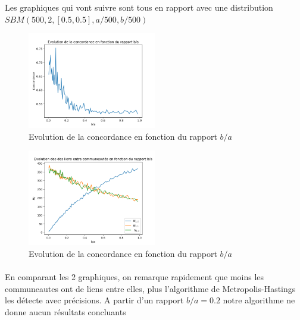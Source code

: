 \subsubsection{}
\paragraph*{}
Les graphiques qui vont suivre sont tous en rapport avec une distribution
 $SBM(500,2,[0.5,0.5],a/500,b/500)$
\begin{figure}[H]
    \centering
    \includegraphics[width=0.5\textwidth]{figs/concordance_a_b.png}
    \caption{Evolution de la concordance en fonction du rapport $b/a$}
\end{figure}
\begin{figure}[H]
    \centering
    \includegraphics[width=0.5\textwidth]{figs/nij.png}
    \caption{Evolution de la concordance en fonction du rapport $b/a$}
\end{figure}

\paragraph*{}
En comparant les 2 graphiques, on remarque rapidement que moins les communeautes
ont de liens entre elles, plus l'algorithme de Metropolis-Hastings les détecte avec 
précisions. A partir d'un rapport $b/a = 0.2 $ notre algorithme ne donne aucun
résultats concluants

\subsubsection{}